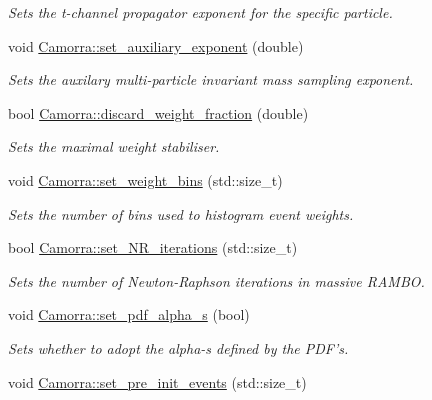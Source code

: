 \begin{DoxyCompactItemize}
\begin{DoxyCompactList}\small\item\em Sets the t-\/channel propagator exponent for the specific particle. \end{DoxyCompactList}\item 
\hypertarget{a00800_a42056a2964334e7944ad4d1d5b66f8f7}{
void \hyperlink{a00800_a42056a2964334e7944ad4d1d5b66f8f7}{Camorra::set\_\-auxiliary\_\-exponent} (double)}
\label{a00800_a42056a2964334e7944ad4d1d5b66f8f7}

\begin{DoxyCompactList}\small\item\em Sets the auxilary multi-\/particle invariant mass sampling exponent. \end{DoxyCompactList}\item 
bool \hyperlink{a00800_ab55cbcca2356be776dcae96786804880}{Camorra::discard\_\-weight\_\-fraction} (double)
\begin{DoxyCompactList}\small\item\em Sets the maximal weight stabiliser. \end{DoxyCompactList}\item 
\hypertarget{a00800_ae75318104c70ca42f203445aa86eda17}{
void \hyperlink{a00800_ae75318104c70ca42f203445aa86eda17}{Camorra::set\_\-weight\_\-bins} (std::size\_\-t)}
\label{a00800_ae75318104c70ca42f203445aa86eda17}

\begin{DoxyCompactList}\small\item\em Sets the number of bins used to histogram event weights. \end{DoxyCompactList}\item 
bool \hyperlink{a00800_a3710f88bf2e06b4efacb54c3b6617e97}{Camorra::set\_\-NR\_\-iterations} (std::size\_\-t)
\begin{DoxyCompactList}\small\item\em Sets the number of Newton-\/Raphson iterations in massive RAMBO. \end{DoxyCompactList}\item 
\hypertarget{a00800_ab077058c21d2081be27e3ccce8cb6a4b}{
void \hyperlink{a00800_ab077058c21d2081be27e3ccce8cb6a4b}{Camorra::set\_\-pdf\_\-alpha\_\-s} (bool)}
\label{a00800_ab077058c21d2081be27e3ccce8cb6a4b}

\begin{DoxyCompactList}\small\item\em Sets whether to adopt the alpha-\/s defined by the PDF's. \end{DoxyCompactList}\item 
\hypertarget{a00800_a22549e2e8a44116fa7de76c01f8f1516}{
void \hyperlink{a00800_a22549e2e8a44116fa7de76c01f8f1516}{Camorra::set\_\-pre\_\-init\_\-events} (std::size\_\-t)}
\label{a00800_a22549e2e8a44116fa7de76c01f8f1516}


\end{DoxyCompactItemize}
